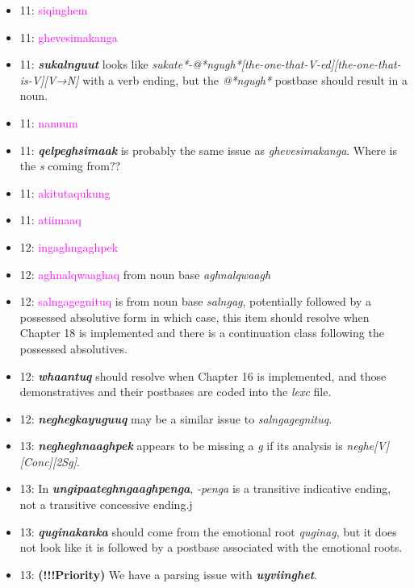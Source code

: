 \documentclass{article}
\begin{document}
\begin{itemize}
\item 11: \textcolor{magenta}{siqinghem}

\item 11: \textcolor{magenta}{ghevesimakanga}

\item 11: \textit{\textbf{sukalnguut}} looks like \textit{sukate*-@*ngugh*[the-one-that-V-ed][the-one-that-is-V][V→N]} with a verb ending, but the \textit{@*ngugh*} postbase should result in a noun.

\item 11: \textcolor{magenta}{nanuum}

\item 11: \textit{\textbf{qelpeghsimaak}} is probably the same issue as \textit{ghevesimakanga}.
%
Where is the \textit{s} coming from??

\item 11: \textcolor{magenta}{akitutaqukung}

\item 11: \textcolor{magenta}{atiimaaq}

\item 12: \textcolor{magenta}{ingaghngaghpek}

\item 12: \textcolor{magenta}{aghnalqwaaghaq} from noun base \textit{aghnalqwaagh}

\item 12: \textcolor{magenta}{salngagegnituq} is from noun base \textit{salngag}, potentially followed by a possessed absolutive form in which case, this item should resolve when Chapter 18 is implemented and there is a continuation class following the possessed absolutives.

\item 12: \textit{\textbf{whaantuq}} should resolve when Chapter 16 is implemented, and those demonstratives and their postbases are coded into the \textit{lexc} file.

\item 12: \textit{\textbf{neghegkayuguuq}} may be a similar issue to \textit{salngagegnituq}.

\item 13: \textit{\textbf{negheghnaaghpek}} appears to be missing a \textit{g} if its analysis is \textit{neghe[V][Conc][2Sg]}.

\item 13: In \textit{\textbf{ungipaateghngaaghpenga}}, \textit{-penga} is a transitive indicative ending, not a transitive concessive ending.j

\item 13: \textit{\textbf{quginakanka}} should come from the emotional root \textit{quginag}, but it does not look like it is followed by a postbase associated with the emotional roots.

\item 13: \textbf{(!!!Priority)} We have a parsing issue with \textit{\textbf{uyviinghet}}.


\end{itemize}
\end{document}
